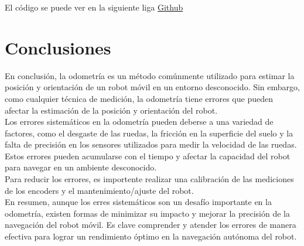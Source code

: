 \documentclass[oneside,onecolumn]{article}
\begin{document}
El código se puede ver en la siguiente liga \href{https://github.com/luisballado/MobileRobotics/blob/main/codes/r_linea2.nxc}{Github}

\section{Conclusiones}

En conclusión, la odometría es un método comúnmente utilizado para estimar la posición y orientación de un robot móvil en un entorno desconocido. Sin embargo, como cualquier técnica de medición, la odometría tiene errores que pueden afectar la estimación de la posición y orientación del robot.\\

Los errores sistemáticos en la odometría pueden deberse a una variedad de factores, como el desgaste de las ruedas, la fricción en la superficie del suelo y la falta de precisión en los sensores utilizados para medir la velocidad de las ruedas. Estos errores pueden acumularse con el tiempo y afectar la capacidad del robot para navegar en un ambiente desconocido.\\

Para reducir los errores, es importente realizar una calibración de las mediciones de los encoders y el mantenimiento/ajuste del robot.\\

En resumen, aunque los erres sistemáticos son un desafío importante en la odometría, existen formas de minimizar su impacto y mejorar la precisión de la navegación del robot móvil. Es clave comprender y atender los errores de manera efectiva para lograr un rendimiento óptimo en la navegación autónoma del robot.

\end{document}
